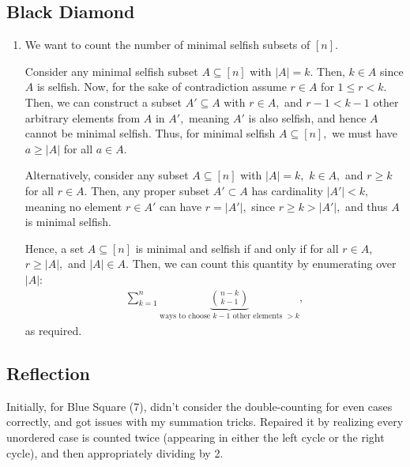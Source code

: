 \documentclass[12pt]{article}
\begin{document}
\subsection{Black Diamond}
\begin{enumerate}
  \item [10] We want to count the number of minimal selfish subsets of $[n].$

    Consider any minimal selfish subset $A \subseteq [n]$ with $|A| =
    k.$ Then, $k \in A$ since $A$ is selfish. Now, for the sake of
    contradiction assume $r \in A$ for $1 \leq r < k.$ Then, we can
    construct a subset $A' \subseteq A$ with $r \in A,$ and $r - 1 <
    k - 1$ other arbitrary elements from $A$ in $A',$ meaning $A'$ is
    also selfish, and hence $A$ cannot be minimal selfish. Thus, for
    minimal selfish $A \subseteq [n],$ we must have $a \geq |A|$ for
    all $a \in A.$

    Alternatively, consider any subset $A \subseteq [n]$ with $|A| =
    k,$ $k \in A,$ and $r \geq k$ for all $r \in A.$ Then, any proper
    subset $A' \subset A$ has cardinality $|A'| < k,$ meaning no
    element $r \in A'$ can have $r = |A'|,$ since $r \geq k > |A'|,$
    and thus $A$ is minimal selfish.

    Hence, a set $A \subseteq [n]$ is minimal and selfish if and only
    if for all $r \in A,$ $r \geq |A|,$ and $|A| \in A.$ Then, we can
    count this quantity by enumerating over $|A|$:
    \begin{align*}
      \sum_{k = 1}^{n} \underbrace{{n - k \choose k - 1}}_\text{ways
      to choose $k - 1$ other elements $> k$},
    \end{align*}
    as required.
\end{enumerate}
\subsection{Reflection}
Initially, for Blue Square (7), didn't consider the double-counting
for even cases correctly, and got issues with my summation tricks.
Repaired it by realizing every unordered case is counted twice
(appearing in either the left cycle or the right cycle), and then
appropriately dividing by 2.
\end{document}
